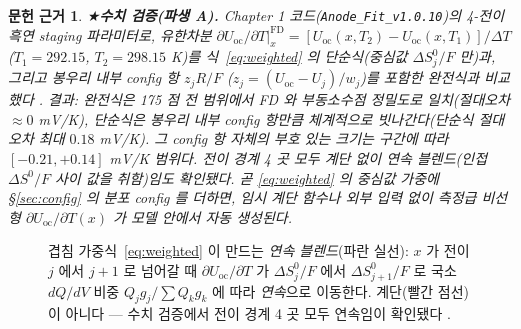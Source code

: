 \documentclass[11pt,a4paper]{article}
\newtheorem*{srcbox}{문헌 근거}
\newcommand{\oc}{\mathrm{oc}}
\begin{document}
\begin{srcbox}
★\textbf{수치 검증(파생 A).} Chapter 1 코드(\texttt{Anode\_Fit\_v1.0.10})의 4-전이 흑연 staging 파라미터로,
유한차분 $\partial U_\oc/\partial T|_x^\mathrm{FD}=[U_\oc(x,T_2)-U_\oc(x,T_1)]/\Delta T$ ($T_1{=}292.15$,
$T_2{=}298.15$ K)를 식~\eqref{eq:weighted} 의 \emph{단순식}(중심값 $\Delta S^0_j/F$ 만)과, 그리고 봉우리 내부
config 항 $z_j R/F$ ($z_j=(U_\oc-U_j)/w_j$)를 포함한 \emph{완전식}과 비교했다 \cite{numverif2026}. 결과:
완전식은 175 점 전 범위에서 FD 와 \emph{부동소수점 정밀도}로 일치(절대오차 $\approx0$ mV/K), 단순식은 봉우리
내부 config 항만큼 체계적으로 빗나간다(단순식 절대오차 최대 $0.18$ mV/K). 그 config 항 자체의 부호 있는 크기는
구간에 따라 $[-0.21,+0.14]$ mV/K 범위다. 전이 경계 4 곳 모두 \emph{계단 없이} 연속 블렌드(인접 $\Delta S^0/F$
사이 값을 취함)임도 확인됐다. 곧 \eqref{eq:weighted} 의 중심값 가중에 \S\ref{sec:config} 의
분포 config 를 더하면, 임시 계단 함수나 외부 입력 없이 \emph{측정급 비선형} $\partial U_\oc/\partial T(x)$ 가
모델 안에서 자동 생성된다.
\end{srcbox}

\begin{figure}[t]
\centering
{}
\caption{겹침 가중식~\eqref{eq:weighted} 이 만드는 \emph{연속 블렌드}(파란 실선): $x$ 가 전이 $j$ 에서 $j{+}1$ 로 넘어갈 때 $\partial U_\oc/\partial T$ 가 $\Delta S^0_j/F$ 에서 $\Delta S^0_{j+1}/F$ 로 국소 $dQ/dV$ 비중 $Q_jg_j/\sum Q_kg_k$ 에 따라 \emph{연속}으로 이동한다. 계단(빨간 점선)이 아니다 — 수치 검증에서 전이 경계 4 곳 모두 연속임이 확인됐다 \cite{numverif2026}.}
\label{fig:blend}
\end{figure}
\end{document}
